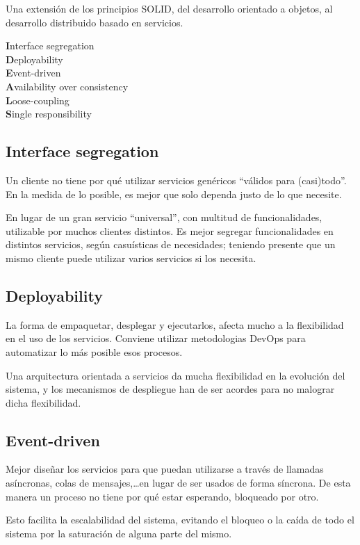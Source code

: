 \documentclass[spanish,12pt,a4paper,final,oneside]{book}
\begin{document}
Una extensión de los principios SOLID, del desarrollo orientado a objetos, al desarrollo distribuido basado en servicios.

\textbf{I}nterface segregation
\\\textbf{D}eployability
\\\textbf{E}vent-driven
\\\textbf{A}vailability over consistency
\\\textbf{L}oose-coupling
\\\textbf{S}ingle responsibility

\subsection{\textbf{I}nterface segregation}

Un cliente no tiene por qué utilizar servicios genéricos ``válidos para (casi)todo''. En la medida de lo posible, es mejor que solo dependa justo de lo que necesite.

En lugar de un gran servicio ``universal'', con multitud de funcionalidades, utilizable por muchos clientes distintos. Es mejor segregar funcionalidades en distintos servicios, según casuísticas de necesidades; teniendo presente que un mismo cliente puede utilizar varios servicios si los necesita.


\subsection{\textbf{D}eployability}

La forma de empaquetar, desplegar y ejecutarlos, afecta mucho a la flexibilidad en el uso de los servicios. Conviene utilizar metodologias DevOps para automatizar lo más posible esos procesos. 

Una arquitectura orientada a servicios da mucha flexibilidad en la evolución del sistema, y los mecanismos de despliegue han de ser acordes para no malograr dicha flexibilidad.  

\subsection{\textbf{E}vent-driven}

Mejor diseñar los servicios para que puedan utilizarse a través de llamadas asíncronas, colas de mensajes,\ldots en lugar de ser usados de forma síncrona. De esta manera un proceso no tiene por qué estar esperando, bloqueado por otro.

Esto facilita la escalabilidad del sistema, evitando el bloqueo o la caída de todo el sistema por la saturación de alguna parte del mismo.
\end{document}

